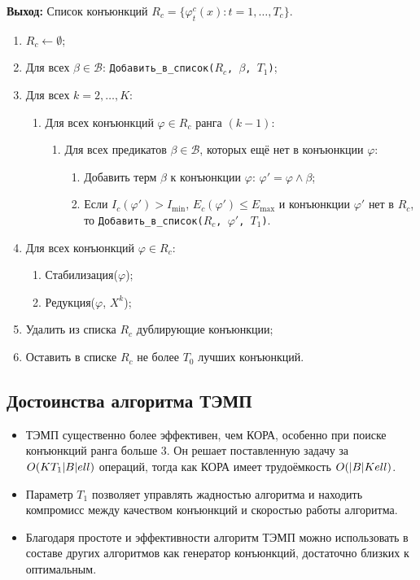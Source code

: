 \textbf{Выход:} Список конъюнкций $R_c = \{\varphi_t^c(x) : t = 1, \dots, T_c\}$.

\begin{enumerate}
    \item $R_c \gets \emptyset$;
    \item Для всех $\beta \in \mathcal{B}$: \texttt{Добавить\_в\_список($R_c$, $\beta$, $T_1$)};
    \item Для всех $k = 2, \dots, K$:
    \begin{enumerate}
        \item Для всех конъюнкций $\varphi \in R_c$ ранга $(k-1)$:
        \begin{enumerate}
            \item Для всех предикатов $\beta \in \mathcal{B}$, которых ещё нет в конъюнкции $\varphi$:
            \begin{enumerate}
                \item Добавить терм $\beta$ к конъюнкции $\varphi$: $\varphi' = \varphi \land \beta$;
                \item Если $I_c(\varphi') > I_{\min}$, $E_c(\varphi') \leq E_{\max}$ и конъюнкции $\varphi'$ нет в $R_c$, то \texttt{Добавить\_в\_список($R_c$, $\varphi'$, $T_1$)}.
            \end{enumerate}
        \end{enumerate}
    \end{enumerate}
    \item Для всех конъюнкций $\varphi \in R_c$:
    \begin{enumerate}
        \item Стабилизация($\varphi$);
        \item Редукция($\varphi$, $X^k$);
    \end{enumerate}
    \item Удалить из списка $R_c$ дублирующие конъюнкции;
    \item Оставить в списке $R_c$ не более $T_0$ лучших конъюнкций.
\end{enumerate}


\subsection{Достоинства алгоритма ТЭМП}

\begin{itemize}
    \item ТЭМП существенно более эффективен, чем КОРА, особенно при поиске конъюнкций ранга больше 3. Он решает поставленную задачу за $O(KT_1|B|\\ell)$ операций, тогда как КОРА имеет трудоёмкость $O(|B|K\\ell)$.
    \item Параметр $T_1$ позволяет управлять жадностью алгоритма и находить компромисс между качеством конъюнкций и скоростью работы алгоритма.
    \item Благодаря простоте и эффективности алгоритм ТЭМП можно использовать в составе других алгоритмов как генератор конъюнкций, достаточно близких к оптимальным.
\end{itemize}

